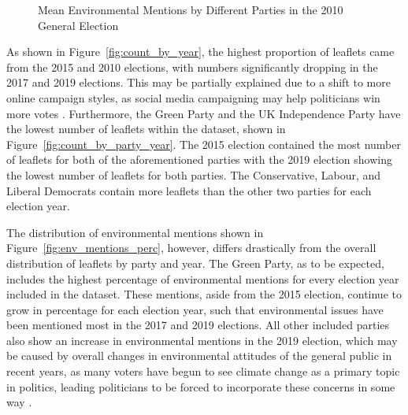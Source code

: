 \documentclass[12pt,letterpaper]{article}
\begin{document}
\begin{figure}[H]
	\caption{Mean Environmental Mentions by Different Parties in the 2010 General Election}
	\label{fig:parties_environmental_mentions}
\end{figure}



As shown in Figure~\ref{fig:count_by_year}, the highest proportion of leaflets came from the 2015 and 2010 elections, with numbers significantly dropping in the 2017 and 2019 elections. This may be partially explained due to a shift to more online campaign styles, as social media campaigning may help politicians win more votes \autocite{brightDoesCampaigningSocial2020}. Furthermore, the Green Party and the UK Independence Party have the lowest number of leaflets within the dataset, shown in Figure~\ref{fig:count_by_party_year}. The 2015 election contained the most number of leaflets for both of the aforementioned parties with the 2019 election showing the lowest number of leaflets for both parties. The Conservative, Labour, and Liberal Democrats contain more leaflets than the other two parties for each election year.  

The distribution of environmental mentions shown in Figure~\ref{fig:env_mentions_perc}, however, differs drastically from the overall distribution of leaflets by party and year. The Green Party, as to be expected, includes the highest percentage of environmental mentions for every election year included in the dataset. These mentions, aside from the 2015 election, continue to grow in percentage for each election year, such that environmental issues have been mentioned most in the 2017 and 2019 elections. All other included parties also show an increase in environmental mentions in the 2019 election, which may be caused by overall changes in environmental attitudes of the general public in recent years, as many voters have begun to see climate change as a primary topic in politics, leading politicians to be forced to incorporate these concerns in some way \autocite{burnsWillBrexitDegrade2020}.



\end{document}
